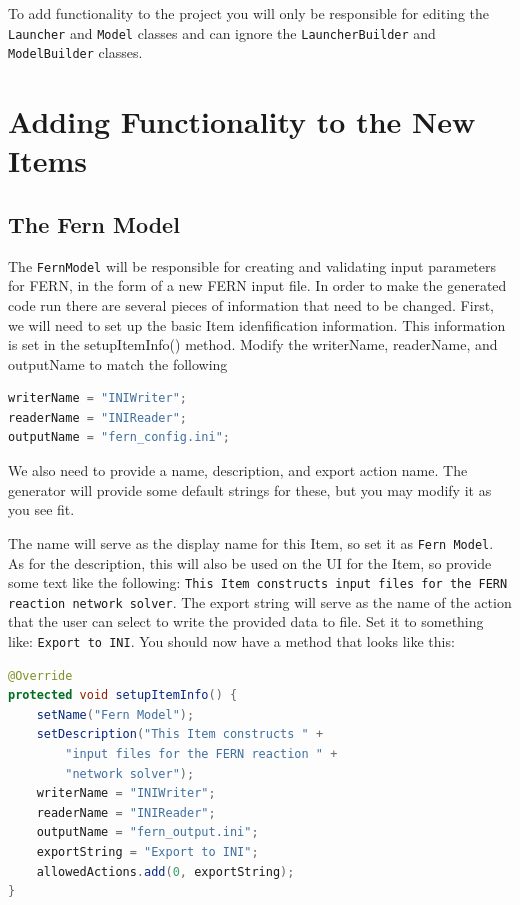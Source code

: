 \documentclass{article}
\begin{document}
To add functionality to the project you will only be responsible for editing
the \texttt{Launcher} and \texttt{Model} classes and can ignore the
\texttt{LauncherBuilder} and \texttt{ModelBuilder} classes.


\section{Adding Functionality to the New Items}

\subsection{The Fern Model}

The \texttt{FernModel} will be responsible for creating and
validating input parameters for FERN, in the form of a new FERN input file.  In
order to make the generated code run there are several pieces of information that need to be changed.  First, we
will need to set up the basic Item idenfification information. This information
is set in the setupItemInfo() method. Modify the writerName, readerName, and
outputName to match the following

\begin{lstlisting}[language=Java]
writerName = "INIWriter";
readerName = "INIReader";
outputName = "fern_config.ini";
\end{lstlisting}

We also need to provide a name, description, and export action name. The
generator will provide some default strings for these, but you may modify it
as you see fit. 

The name will serve as the display name for this Item, so set it
as \texttt{Fern Model}.
As for the description, this will also be used on the UI for the Item, so
provide some text like the following: \texttt{This Item constructs input files
for the FERN reaction network solver}. The export string will serve as the name
of the action that the user can select to write the provided data to file. Set
it to something like: \texttt{Export to INI}. You should now have a method that
looks like this:

\begin{lstlisting}[language=Java]
@Override
protected void setupItemInfo() {
	setName("Fern Model");
	setDescription("This Item constructs " +
	    "input files for the FERN reaction " +
	    "network solver"); 
	writerName = "INIWriter";
	readerName = "INIReader";     	
	outputName = "fern_output.ini";   
	exportString = "Export to INI";
	allowedActions.add(0, exportString);
}
\end{lstlisting}
\end{document}
